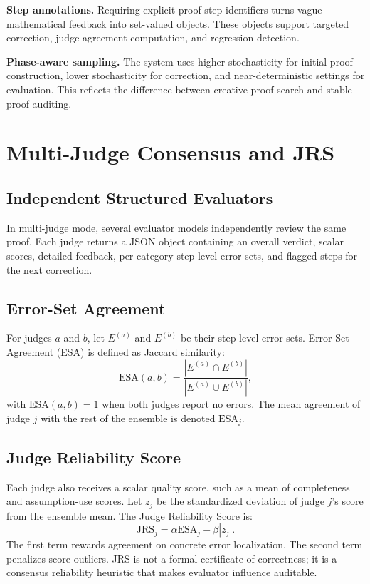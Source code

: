 \documentclass[conference]{IEEEtran}
\newcommand{\ESA}{\mathrm{ESA}}
\newcommand{\JRS}{\mathrm{JRS}}
\begin{document}
\textbf{Step annotations.} Requiring explicit proof-step identifiers turns vague mathematical feedback into set-valued objects. These objects support targeted correction, judge agreement computation, and regression detection.

\textbf{Phase-aware sampling.} The system uses higher stochasticity for initial proof construction, lower stochasticity for correction, and near-deterministic settings for evaluation. This reflects the difference between creative proof search and stable proof auditing.

\section{Multi-Judge Consensus and JRS}
\label{sec:jrs}

\subsection{Independent Structured Evaluators}
In multi-judge mode, several evaluator models independently review the same proof. Each judge returns a JSON object containing an overall verdict, scalar scores, detailed feedback, per-category step-level error sets, and flagged steps for the next correction.

\subsection{Error-Set Agreement}
For judges $a$ and $b$, let $E^{(a)}$ and $E^{(b)}$ be their step-level error sets. Error Set Agreement (ESA) is defined as Jaccard similarity:
\begin{equation}
    \ESA(a,b) =
    \frac{|E^{(a)} \cap E^{(b)}|}
         {|E^{(a)} \cup E^{(b)}|},
\end{equation}
with $\ESA(a,b)=1$ when both judges report no errors. The mean agreement of judge $j$ with the rest of the ensemble is denoted $\ESA_j$.

\subsection{Judge Reliability Score}
Each judge also receives a scalar quality score, such as a mean of completeness and assumption-use scores. Let $z_j$ be the standardized deviation of judge $j$'s score from the ensemble mean. The Judge Reliability Score is:
\begin{equation}
    \JRS_j = \alpha \ESA_j - \beta |z_j|.
\end{equation}
The first term rewards agreement on concrete error localization. The second term penalizes score outliers. JRS is not a formal certificate of correctness; it is a consensus reliability heuristic that makes evaluator influence auditable.
\end{document}
